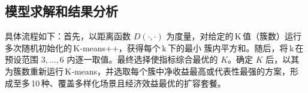 


\subsection[\hspace{-2pt}模型求解和结果分析]{{\heiti{} \hspace{-8pt}模型求解和结果分析}}\label{section2: 模型求解和结果分析}

具体流程如下：首先，以距离函数 $D(\cdot,\cdot)$ 为度量，对给定的 K 值（簇数）运行多次随机初始化的 K‑means++，获得每个 k 下的最小 簇内平方和。随后，将 k 在预设范围 $3,\dots ,6$ 内逐一取值。最终选择使指标综合最优的 $K$。确定 $K$ 后，以其为簇数重新运行 K‑means，并选取每个簇中净收益最高或代表性最强的方案，形成至多 10 种、覆盖多样化场景且经济效益最优的扩容套餐。

